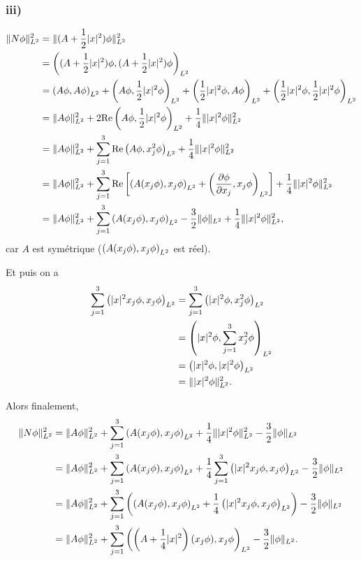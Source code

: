\subsubsection*{iii)}
%
\begin{align}
    \normelds{N \phi}^2 &= \normelds{(A + \ud |x|^2) \phi}^2 \\
    &= \pslts{(A + \ud |x|^2) \phi}{(A + \ud |x|^2) \phi} \\
%
    &= \pslts{A \phi}{A \phi}
    + \pslts{A \phi}{\ud |x|^2 \phi}
    + \pslts{\ud |x|^2 \phi}{A  \phi}
    + \pslts{\ud |x|^2 \phi}{\ud |x|^2 \phi} \\
%
    &= \normelds{A \phi}^2
    + 2 \text{Re} \pslts{A \phi}{\ud |x|^2 \phi}
    + \udd{4} \normelds{|x|^2 \phi}^2 \\
%
    &= \normelds{A \phi}^2
    + \sum_{j=1}^3 \text{Re} \pslts{A \phi}{x_j^2 \phi}
    + \udd{4} \normelds{|x|^2 \phi}^2 \\
%
    &= \normelds{A \phi}^2
    + \sum_{j=1}^3 \text{Re}
    \left[ \pslts{A(x_j \phi)}{x_j \phi}
        + \pslts{\frac{\partial \phi}{\partial x_j}}{x_j \phi} \right]
    + \udd{4} \normelds{|x|^2 \phi}^2 \\
%
    &= \normelds{A \phi}^2
    + \sum_{j=1}^3 \pslts{A(x_j \phi)}{x_j \phi}
    - \frac{3}{2} \normelds{\phi}
    + \udd{4} \normelds{|x|^2 \phi}^2,
\end{align}
%
car $A$ est symétrique ($\left( A(x_j \phi), x_j \phi \right)_{L^2}$ est réel).

Et puis on a
\begin{align}
    \sum_{j=1}^3 \left( |x|^2 x_j \phi, x_j \phi \right)_{L^2}
    &= \sum_{j=1}^3 \left( |x|^2 \phi, x_j^2 \phi \right)_{L^2} \\
    &= \left( |x|^2 \phi, \sum_{j=1}^3 x_j^2 \phi \right)_{L^2} \\
    &= \left( |x|^2 \phi, |x|^2 \phi \right)_{L^2} \\
    &= \| |x|^2 \phi \|_{L^2}^2.
\end{align}

Alors finalement,
\begin{align}
    \normelds{N \phi}^2
    &= \normelds{A \phi}^2
    + \sum_{j=1}^3 \pslts{A(x_j \phi)}{x_j \phi}
    + \udd{4} \normelds{|x|^2 \phi}^2
    - \frac{3}{2} \normelds{\phi} \\
%
    &= \normelds{A \phi}^2
    + \sum_{j=1}^3 \pslts{A(x_j \phi)}{x_j \phi}
    + \udd{4} \sum_{j=1}^3 \pslts{|x|^2 x_j \phi}{x_j \phi}
    - \frac{3}{2} \normelds{\phi} \\
%
    &= \normelds{A \phi}^2
    + \sum_{j=1}^3 \left( \pslts{A(x_j \phi)}{x_j \phi}
    + \udd{4} \pslts{|x|^2 x_j \phi}{x_j \phi} \right)
    - \frac{3}{2} \normelds{\phi} \\
%
    &= \normelds{A \phi}^2
    + \sum_{j=1}^3 \pslts{ \left( A + \udd{4} |x|^2 \right) (x_j \phi)}{x_j \phi}
    - \frac{3}{2} \normelds{\phi}.
\end{align}

